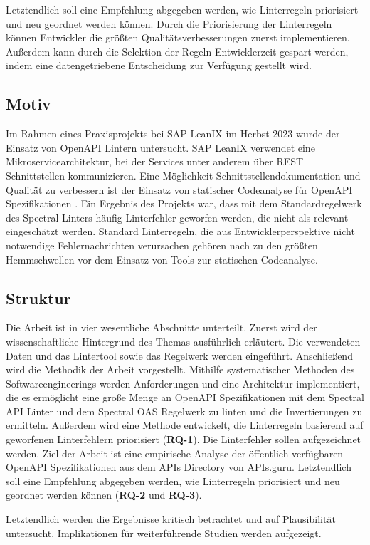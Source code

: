 Letztendlich soll eine Empfehlung abgegeben werden, wie Linterregeln priorisiert und neu geordnet werden können. Durch die Priorisierung der Linterregeln können Entwickler die größten Qualitätsverbesserungen zuerst implementieren. Außerdem kann durch die Selektion der Regeln Entwicklerzeit gespart werden, indem eine datengetriebene Entscheidung zur Verfügung gestellt wird.

\subsection{Motiv} \label{sec:motiv}
Im Rahmen eines Praxisprojekts bei SAP LeanIX im Herbst 2023 wurde der Einsatz von OpenAPI Lintern untersucht. SAP LeanIX verwendet eine Mikroservicearchitektur, bei der Services unter anderem über REST Schnittstellen kommunizieren. Eine Möglichkeit Schnittstellendokumentation und Qualität zu verbessern ist der Einsatz von statischer Codeanalyse für OpenAPI Spezifikationen \parencite{bogner_restruler_2024}. Ein Ergebnis des Projekts war, dass mit dem Standardregelwerk des Spectral Linters häufig Linterfehler geworfen werden, die nicht als relevant eingeschätzt werden. Standard Linterregeln, die aus Entwicklerperspektive nicht notwendige Fehlernachrichten verursachen gehören nach \parencite{christakis_what_2016} zu den größten Hemmschwellen vor dem Einsatz von Tools zur statischen Codeanalyse. 

\subsection{Struktur} \label{sec:struktur}
Die Arbeit ist in vier wesentliche Abschnitte unterteilt. Zuerst wird der wissenschaftliche Hintergrund des Themas ausführlich erläutert. Die verwendeten Daten und das Lintertool sowie das Regelwerk werden eingeführt. Anschließend wird die Methodik der Arbeit vorgestellt. Mithilfe systematischer Methoden des Softwareengineerings werden Anforderungen und eine Architektur implementiert, die es ermöglicht eine große Menge an OpenAPI Spezifikationen mit dem Spectral API Linter und dem Spectral OAS Regelwerk zu linten und die Invertierungen zu ermitteln. Außerdem wird eine Methode entwickelt, die Linterregeln basierend auf geworfenen Linterfehlern priorisiert (\textbf{RQ-1}).
Die Linterfehler sollen aufgezeichnet werden. Ziel der Arbeit ist eine empirische Analyse der öffentlich verfügbaren OpenAPI Spezifikationen aus dem APIs Directory von APIs.guru. Letztendlich soll eine Empfehlung abgegeben werden, wie Linterregeln priorisiert und neu  geordnet werden können (\textbf{RQ-2} und \textbf{RQ-3}). 

Letztendlich werden die Ergebnisse kritisch betrachtet und auf Plausibilität untersucht. Implikationen für weiterführende Studien werden aufgezeigt.